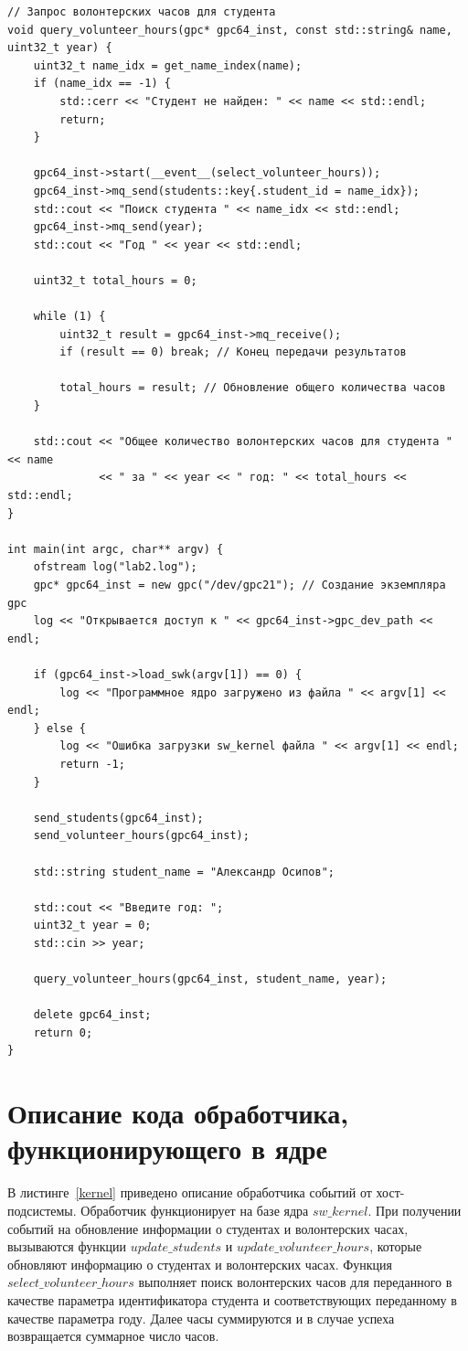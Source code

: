 \documentclass{article}
\begin{document}
\begin{lstlisting}[style=lang, label=host, caption=Описание хост-подсистемы]
// Запрос волонтерских часов для студента
void query_volunteer_hours(gpc* gpc64_inst, const std::string& name, uint32_t year) {
    uint32_t name_idx = get_name_index(name);
    if (name_idx == -1) {
        std::cerr << "Студент не найден: " << name << std::endl;
        return;
    }

    gpc64_inst->start(__event__(select_volunteer_hours));
    gpc64_inst->mq_send(students::key{.student_id = name_idx});
    std::cout << "Поиск студента " << name_idx << std::endl;
    gpc64_inst->mq_send(year);
    std::cout << "Год " << year << std::endl;

    uint32_t total_hours = 0;

    while (1) {
        uint32_t result = gpc64_inst->mq_receive();
        if (result == 0) break; // Конец передачи результатов

        total_hours = result; // Обновление общего количества часов
    }

    std::cout << "Общее количество волонтерских часов для студента " << name
              << " за " << year << " год: " << total_hours << std::endl;
}

int main(int argc, char** argv) {
    ofstream log("lab2.log");
    gpc* gpc64_inst = new gpc("/dev/gpc21"); // Создание экземпляра gpc
    log << "Открывается доступ к " << gpc64_inst->gpc_dev_path << endl;

    if (gpc64_inst->load_swk(argv[1]) == 0) {
        log << "Программное ядро загружено из файла " << argv[1] << endl;
    } else {
        log << "Ошибка загрузки sw_kernel файла " << argv[1] << endl;
        return -1;
    }

    send_students(gpc64_inst);
    send_volunteer_hours(gpc64_inst);

    std::string student_name = "Александр Осипов";

    std::cout << "Введите год: ";
    uint32_t year = 0;
    std::cin >> year;

    query_volunteer_hours(gpc64_inst, student_name, year);

    delete gpc64_inst;
    return 0;
}
\end{lstlisting}

\clearpage\section{Описание кода обработчика, функционирующего в ядре}

В листинге~\ref{kernel} приведено описание обработчика событий от хост-подсистемы. Обработчик функционирует на базе
ядра $sw\_kernel$. При получении событий на обновление информации о студентах и волонтерских часах, вызываются функции
$update\_students$ и $update\_volunteer\_hours$, которые обновляют информацию о студентах и волонтерских часах. Функция
$select\_volunteer\_hours$ выполняет поиск волонтерских часов для переданного в качестве параметра идентификатора студента
и соответствующих переданному в качестве параметра году. Далее часы суммируются и в случае успеха
возвращается суммарное число часов.
\end{document}
